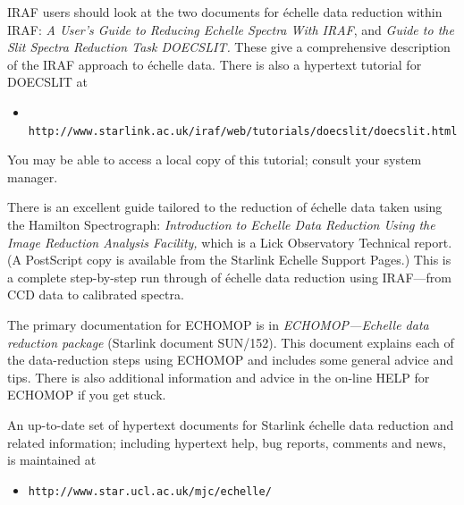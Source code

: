 \documentclass[twoside,11pt]{article}
\newcommand{\htmladdnormallink}[2]{#1}
\newenvironment{latexonly}{}{}
\newcommand{\xref}[3]{#1}
\newcommand{\sgspec}[2]{#1}
\newcommand{\sgspec}[2]{#2}
\begin{document}
IRAF users should look at the two documents for \'{e}chelle data reduction
within IRAF:
\htmladdnormallink{{\sl A User's Guide to Reducing Echelle Spectra With IRAF}}
{ftp://starlink-ftp.rl.ac.uk/pub/iraf/iraf/docs/ech.ps.Z}, and
\htmladdnormallink{{\sl Guide to the Slit Spectra Reduction Task DOECSLIT.}}
{ftp://starlink-ftp.rl.ac.uk/pub/iraf/iraf/docs/doecslit.ps.Z}
These give a comprehensive description of the IRAF approach to \'{e}chelle
data.  There is also a hypertext tutorial for DOECSLIT at

\begin{itemize}

\item \htmladdnormallink{{\tt
      http://www.starlink.ac.uk/iraf/web/tutorials/doecslit/doecslit.html}}
      {http://www.starlink.ac.uk/iraf/web/tutorials/doecslit/doecslit.html}

\end{itemize}

You may be able to access a local copy of this tutorial; consult your
system manager.

There is an excellent guide tailored to the reduction of \'{e}chelle
data taken using the Hamilton Spectrograph:
\htmladdnormallink{{\sl Introduction to Echelle
Data Reduction  Using the Image Reduction Analysis Facility,}}
{http://www.star.ucl.ac.uk/\~{}mjc/echelle/misc/LickTech74.ps.gz} which is a
Lick Observatory Technical report\@.
\begin{latexonly}
(A PostScript copy is available from the Starlink Echelle Support
Pages.)
\end{latexonly}
This is a complete
step-by-step run through of \'{e}chelle data reduction using
IRAF\sgspec{---}{ - }from CCD data to calibrated spectra.

The primary documentation for ECHOMOP is in \xref{{\sl
ECHOMOP\sgspec{---}{ - }Echelle
data reduction package} (Starlink document SUN/152)}{sun152}{}\@.
This document explains each of the data-reduction steps using ECHOMOP and
includes some general advice and tips.
There is also additional information and advice in the on-line HELP for
ECHOMOP if you get stuck.

An up-to-date set of hypertext documents for Starlink \'{e}chelle data
reduction and related information; including hypertext help, bug
reports, comments and news, is maintained at

\begin{itemize}

\item \sgspec{{\tt http://www.star.ucl.ac.uk/mjc/echelle/}}
      {\htmladdnormallink{\verb+http://www.star.ucl.ac.uk/~mjc/echelle/+}
      {http://www.star.ucl.ac.uk/\~{}mjc/echelle/}}

\end{itemize}
\end{document}
